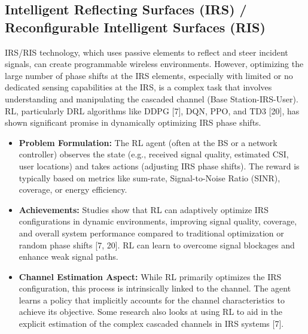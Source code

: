 \documentclass[journal,twocolumn]{IEEEtran}
\begin{document}
\subsection{Intelligent Reflecting Surfaces (IRS) / Reconfigurable Intelligent Surfaces (RIS)}
IRS/RIS technology, which uses passive elements to reflect and steer incident signals, can create programmable wireless environments. However, optimizing the large number of phase shifts at the IRS elements, especially with limited or no dedicated sensing capabilities at the IRS, is a complex task that involves understanding and manipulating the cascaded channel (Base Station-IRS-User).
RL, particularly DRL algorithms like DDPG [7], DQN, PPO, and TD3 [20], has shown significant promise in dynamically optimizing IRS phase shifts.
\begin{itemize}
    \item \textbf{Problem Formulation:} The RL agent (often at the BS or a network controller) observes the state (e.g., received signal quality, estimated CSI, user locations) and takes actions (adjusting IRS phase shifts). The reward is typically based on metrics like sum-rate, Signal-to-Noise Ratio (SINR), coverage, or energy efficiency.
    \item \textbf{Achievements:} Studies show that RL can adaptively optimize IRS configurations in dynamic environments, improving signal quality, coverage, and overall system performance compared to traditional optimization or random phase shifts [7, 20]. RL can learn to overcome signal blockages and enhance weak signal paths.
    \item \textbf{Channel Estimation Aspect:} While RL primarily optimizes the IRS configuration, this process is intrinsically linked to the channel. The agent learns a policy that implicitly accounts for the channel characteristics to achieve its objective. Some research also looks at using RL to aid in the explicit estimation of the complex cascaded channels in IRS systems [7].
\end{itemize}
\end{document}
